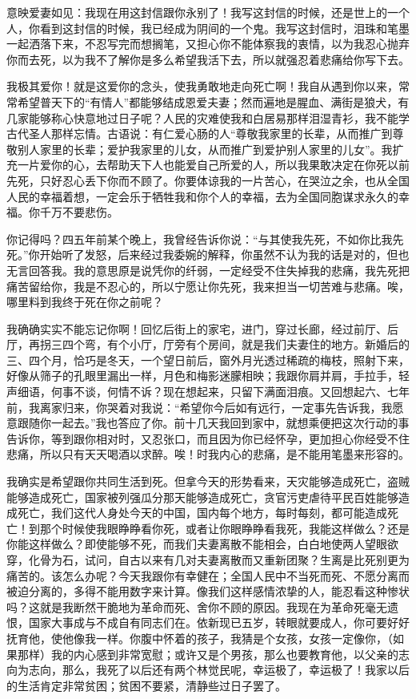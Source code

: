 \documentclass[12pt,UTF-8,openany,a4]{ctexbook}
\begin{document}
\begin{large}\yiwen
    
    意映爱妻如见：我现在用这封信跟你永别了！我写这封信的时候，还是世上的一个人，你看到这封信的时候，我已经成为阴间的一个鬼。我写这封信时，泪珠和笔墨一起洒落下来，不忍写完而想搁笔，又担心你不能体察我的衷情，以为我忍心抛弃你而去死，以为我不了解你是多么希望我活下去，所以就强忍着悲痛给你写下去。
    
    我极其爱你！就是这爱你的念头，使我勇敢地走向死亡啊！我自从遇到你以来，常常希望普天下的“有情人”都能够结成恩爱夫妻；然而遍地是腥血、满街是狼犬，有几家能够称心快意地过日子呢？人民的灾难使我和白居易那样泪湿青衫，我不能学古代圣人那样忘情。古语说：有仁爱心肠的人“尊敬我家里的长辈，从而推广到尊敬别人家里的长辈；爱护我家里的儿女，从而推广到爱护别人家里的儿女”。我扩充一片爱你的心，去帮助天下人也能爱自己所爱的人，所以我果敢决定在你死以前先死，只好忍心丢下你而不顾了。你要体谅我的一片苦心，在哭泣之余，也从全国人民的幸福着想，一定会乐于牺牲我和你个人的幸福，去为全国同胞谋求永久的幸福。你千万不要悲伤。
    
    你记得吗？四五年前某个晚上，我曾经告诉你说：“与其使我先死，不如你比我先死。”你开始听了发怒，后来经过我委婉的解释，你虽然不认为我的话是对的，但也无言回答我。我的意思原是说凭你的纤弱，一定经受不住失掉我的悲痛，我先死把痛苦留给你，我是不忍心的，所以宁愿让你先死，我来担当一切苦难与悲痛。唉，哪里料到我终于死在你之前呢？
    
    我确确实实不能忘记你啊！回忆后街上的家宅，进门，穿过长廊，经过前厅、后厅，再拐三四个弯，有个小厅，厅旁有个房间，就是我们夫妻住的地方。新婚后的三、四个月，恰巧是冬天，一个望日前后，窗外月光透过稀疏的梅枝，照射下来，好像从筛子的孔眼里漏出一样，月色和梅影迷朦相映；我跟你肩并肩，手拉手，轻声细语，何事不谈，何情不诉？现在想起来，只留下满面泪痕。又回想起六、七年前，我离家归来，你哭着对我说：“希望你今后如有远行，一定事先告诉我，我愿意跟随你一起去。”我也答应了你。前十几天我回到家中，就想乘便把这次行动的事告诉你，等到跟你相对时，又忍张口，而且因为你已经怀孕，更加担心你经受不住悲痛，所以只有天天喝酒以求醉。唉！时我内心的悲痛，是不能用笔墨来形容的。
    
    我确实是希望跟你共同生活到死。但拿今天的形势看来，天灾能够造成死亡，盗贼能够造成死亡，国家被列强瓜分那天能够造成死亡，贪官污吏虐待平民百姓能够造成死亡，我们这代人身处今天的中国，国内每个地方，每时每刻，都可能造成死亡！到那个时候使我眼睁睁看你死，或者让你眼睁睁看我死，我能这样做么？还是你能这样做么？即使能够不死，而我们夫妻离散不能相会，白白地使两人望眼欲穿，化骨为石，试问，自古以来有几对夫妻离散而又重新团聚？生离是比死别更为痛苦的。该怎么办呢？今天我跟你有幸健在；全国人民中不当死而死、不愿分离而被迫分离的，多得不能用数字来计算。像我们这样感情浓挚的人，能忍看这种惨状吗？这就是我断然干脆地为革命而死、舍你不顾的原因。我现在为革命死毫无遗恨，国家大事成与不成自有同志们在。依新现已五岁，转眼就要成人，你可要好好抚育他，使他像我一样。你腹中怀着的孩子，我猜是个女孩，女孩一定像你，（如果那样）我的内心感到非常宽慰；或许又是个男孩，那么也要教育他，以父亲的志向为志向，那么，我死了以后还有两个林觉民呢，幸运极了，幸运极了！我家以后的生活肯定非常贫困；贫困不要紧，清静些过日子罢了。
    

\end{large}
\end{document}
